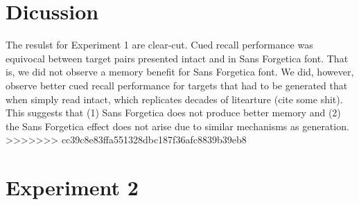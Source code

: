\documentclass[pdf]{apa6}
\begin{document}
\hypertarget{dicussion}{%
\section{Dicussion}\label{dicussion}}

The resulst for Experiment 1 are clear-cut. Cued recall performance was equivocal between target pairs presented intact and in Sans Forgetica font. That is, we did not observe a memory benefit for Sans Forgetica font. We did, however, observe better cued recall performance for targets that had to be generated that when simply read intact, which replicates decades of litearture (cite some shit). This suggests that (1) Sans Forgetica does not produce better memory and (2) the Sans Forgetica effect does not arise due to similar mechanisms as generation.
>>>>>>> cc39c8e83ffa551328dbc187f36afc8839b39eb8

\hypertarget{experiment-2}{%
\section{Experiment 2}\label{experiment-2}}
\end{document}
